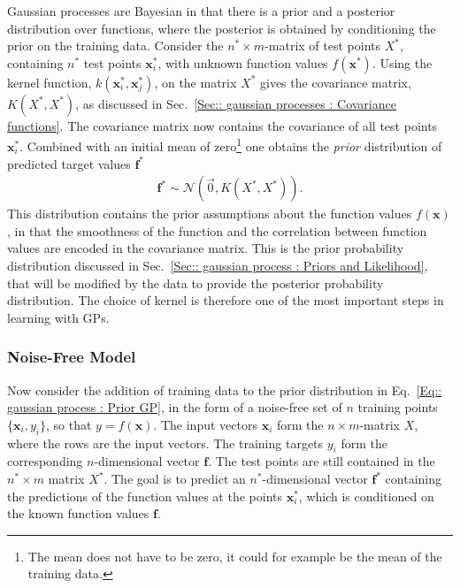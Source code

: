 \documentclass[twoside,english]{uiofysmaster}
\begin{document}
{Gaussian processes are Bayesian in that there is a prior and a posterior distribution over functions, where the posterior is obtained by conditioning the prior on the training data. Consider the $n^* \times m$-matrix of test points $X^*$, containing $n^*$ test points $\textbf{x}_i^*$, with unknown function values $f(\textbf{x}^*)$. Using the kernel function, $k(\textbf{x}_i^*, \textbf{x}_j^*)$, on the matrix $X^*$ gives the covariance matrix, $K(X^*, X^*)$, as discussed in Sec.~\ref{Sec:: gaussian processes : Covariance functions}. The covariance matrix  now contains the covariance of all test points $\textbf{x}^*_i$. Combined with an initial mean of zero\footnote{The mean does not have to be zero, it could for example be the mean of the training data.} one obtains the \textit{prior} distribution of predicted target values $\textbf{f}^*$
\begin{align}
\textbf{f}^* \sim \mathcal{N} (\vec{0}, K(X^*, X^*)).\label{Eq:: gaussian process : Prior GP}
\end{align} 
This distribution contains the prior assumptions about the function values $f(\textbf{x})$, in that the smoothness of the function and the correlation between function values are encoded in the covariance matrix. This is the prior probability distribution discussed in Sec.~\ref{Sec:: gaussian process : Priors and Likelihood}, that will be modified by the data to provide the posterior probability distribution. The choice of kernel is therefore one of the most important steps in learning with GPs. 

\subsubsection{Noise-Free Model}

Now consider the addition of training data to the prior distribution in Eq.~\ref{Eq:: gaussian process : Prior GP}, in the form of a noise-free set of $n$ training points $\{\textbf{x}_i, y_i\}$, so that $y = f(\textbf{x})$. The input vectors $\textbf{x}_i$ form the $n \times m$-matrix $X$, where the rows are the input vectors. The training targets $y_i$ form the corresponding $n$-dimensional vector $\textbf{f}$. The test points are still contained in the $n^* \times m$ matrix $X^*$. The goal is to predict an $n^*$-dimensional vector $\textbf{f}^*$ containing the predictions of the function values at the points $\textbf{x}^*_i$, which is conditioned on the known function values $\textbf{f}$. 

}
\end{document}
